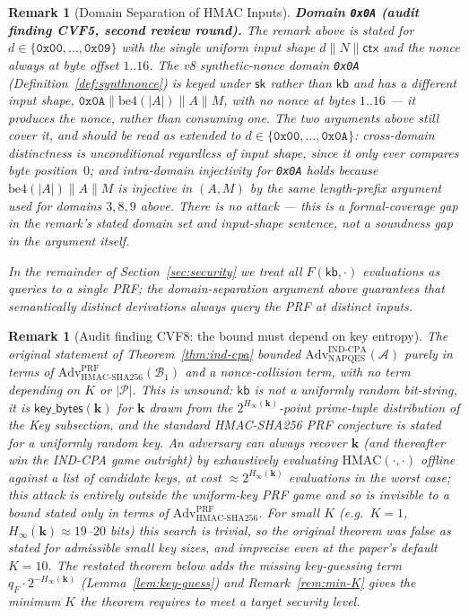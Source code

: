 \documentclass[11pt,a4paper]{article}
\newtheorem{remark}[theorem]{Remark}
\begin{document}
\begin{remark}[Domain Separation of HMAC Inputs]
\noindent
\textbf{Domain \texttt{0x0A} (audit finding CVF5, second review round).}
The remark above is stated for $d\in\{\texttt{0x00},\ldots,\texttt{0x09}\}$
with the single uniform input shape $d\|N\|\mathsf{ctx}$ and the nonce
always at byte offset $1..16$. The v8 synthetic-nonce domain
\texttt{0x0A} (Definition~\ref{def:synthnonce}) is keyed under $\mathsf{sk}$
rather than $\mathsf{kb}$ and has a different input shape,
$\texttt{0x0A}\|\mathrm{be4}(|A|)\|A\|M$, with no nonce at bytes $1..16$
--- it \emph{produces} the nonce, rather than consuming one. The two
arguments above still cover it, and should be read as extended to
$d\in\{\texttt{0x00},\ldots,\texttt{0x0A}\}$: cross-domain distinctness is
unconditional regardless of input shape, since it only ever compares byte
position~$0$; and intra-domain injectivity for \texttt{0x0A} holds because
$\mathrm{be4}(|A|)\|A\|M$ is injective in $(A,M)$ by the same
length-prefix argument used for domains $3,8,9$ above. There is no attack
--- this is a formal-coverage gap in the remark's stated domain set and
input-shape sentence, not a soundness gap in the argument itself.

In the remainder of Section~\ref{sec:security} we treat all
$F(\mathsf{kb},\cdot)$ evaluations as queries to a single PRF; the
domain-separation argument above guarantees that semantically distinct
derivations always query the PRF at distinct inputs.
\end{remark}

\begin{remark}[Audit finding CVF8: the bound must depend on key entropy]
\label{rem:cvf8}
The original statement of Theorem~\ref{thm:ind-cpa} bounded
$\mathrm{Adv}^{\mathrm{IND\text{-}CPA}}_{\mathrm{NAPQES}}(\mathcal{A})$
purely in terms of $\mathrm{Adv}^{\mathrm{PRF}}_{\mathrm{HMAC\text{-}SHA256}}(\mathcal{B}_1)$
and a nonce-collision term, with no term depending on $K$ or $|\mathcal{P}|$.
This is unsound: $\mathsf{kb}$ is not a uniformly random bit-string, it is
$\mathsf{key\_bytes}(\mathbf{k})$ for $\mathbf{k}$ drawn from the
$2^{H_\infty(\mathbf{k})}$-point prime-tuple distribution of the Key
subsection, and the standard HMAC-SHA256 PRF conjecture is stated for a
uniformly random key. An adversary can always recover $\mathbf{k}$ (and
thereafter win the IND-CPA game outright) by exhaustively evaluating
$\mathrm{HMAC}(\cdot, \cdot)$ offline against a list of candidate keys, at
cost $\approx 2^{H_\infty(\mathbf{k})}$ evaluations in the worst case; this
attack is entirely outside the uniform-key PRF game and so is invisible to
a bound stated only in terms of $\mathrm{Adv}^{\mathrm{PRF}}_{\mathrm{HMAC\text{-}SHA256}}$.
For small $K$ (e.g.\ $K=1$, $H_\infty(\mathbf{k})\approx 19$--$20$ bits)
this search is trivial, so the original theorem was false as stated for
admissible small key sizes, and imprecise even at the paper's default
$K=10$. The restated theorem below adds the missing key-guessing term
$q_F \cdot 2^{-H_\infty(\mathbf{k})}$ (Lemma~\ref{lem:key-guess}) and
Remark~\ref{rem:min-K} gives the minimum $K$ the theorem requires to meet
a target security level.
\end{remark}
\end{document}
